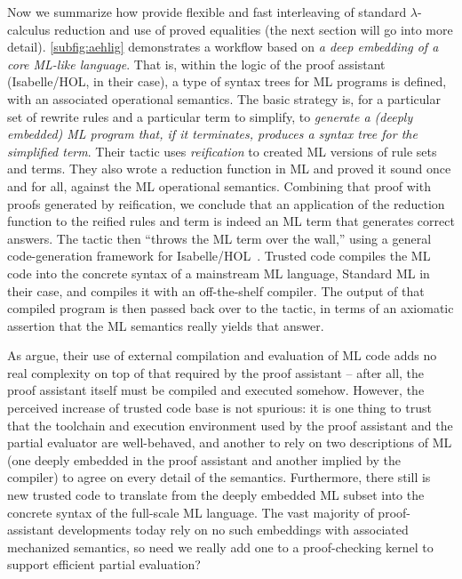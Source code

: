 \documentclass[sigplan,10pt,review,anonymous]{acmart}\settopmatter{printfolios=true,printccs=false,printacmref=false}
\begin{document}
Now we summarize how \citet{Aehlig} provide flexible and fast interleaving of standard $\lambda$-calculus reduction and use of proved equalities (the next section will go into more detail).
\autoref{subfig:aehlig} demonstrates a workflow based on \emph{a deep embedding of a core ML-like language}.
That is, within the logic of the proof assistant (Isabelle/HOL, in their case), a type of syntax trees for ML programs is defined, with an associated operational semantics.
The basic strategy is, for a particular set of rewrite rules and a particular term to simplify, to \emph{generate a (deeply embedded) ML program that, if it terminates, produces a syntax tree for the simplified term}.
Their tactic uses \emph{reification} to created ML versions of rule sets and terms.
They also wrote a reduction function in ML and proved it sound once and for all, against the ML operational semantics.
Combining that proof with proofs generated by reification, we conclude that an application of the reduction function to the reified rules and term is indeed an ML term that generates correct answers.
The tactic then ``throws the ML term over the wall,'' using a general code-generation framework for Isabelle/HOL~\cite{CodeGen}.
Trusted code compiles the ML code into the concrete syntax of a mainstream ML language, Standard ML in their case, and compiles it with an off-the-shelf compiler.
The output of that compiled program is then passed back over to the tactic, in terms of an axiomatic assertion that the ML semantics really yields that answer.

As \citet{Aehlig} argue, their use of external compilation and evaluation of ML code adds no real complexity on top of that required by the proof assistant -- after all, the proof assistant itself must be compiled and executed somehow.
However, the perceived increase of trusted code base is not spurious:
it is one thing to trust that the toolchain and execution environment used by the proof assistant and the partial evaluator are well-behaved,
and another to rely on two descriptions of ML (one deeply embedded in the proof assistant and another implied by the compiler) to agree on every detail of the semantics.
Furthermore, there still is new trusted code to translate from the deeply embedded ML subset into the concrete syntax of the full-scale ML language.
The vast majority of proof-assistant developments today rely on no such embeddings with associated mechanized semantics, so need we really add one to a proof-checking kernel to support efficient partial evaluation?
\end{document}

